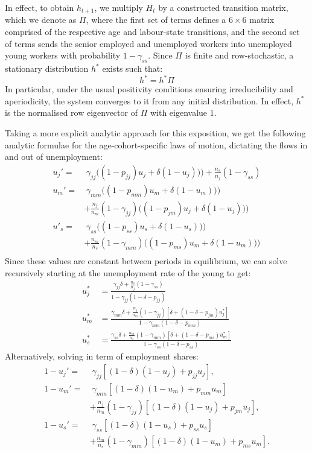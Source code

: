 \documentclass{article}
\begin{document}
In effect, to obtain $h_{t+1}$, we multiply $H_t$ by a constructed transition matrix, which we denote as $\Pi$, where the first set of terms defines a $6\times6$ matrix comprised of the respective age and labour-state transitions, and the second set of terms sends the senior employed and unemployed workers into unemployed young workers with probability $1-\gamma_{ss}$. Since $\Pi$ is finite and row-stochastic, a stationary distribution $h^*$ exists such that:
\[
h^*=h^*\Pi
\]
In particular, under the usual positivity conditions ensuring irreducibility and aperiodicity, the system converges to it from any initial distribution. In effect, $h^*$ is the normalised row eigenvector of $\Pi$ with eigenvalue $1$.

Taking a more explicit analytic approach for this exposition, we get the following analytic formulae for the age-cohort-specific laws of motion, dictating the flows in and out of unemployment:
\begin{align*}
u_j'=&\;\gamma_{jj}\bigl((1-p_{jj})u_j+\delta(1-u_j))\bigr) + \frac{n_s}{n_j}(1-\gamma_{ss})\\
u_m'=&\;\gamma_{mm}\bigl((1-p_{mm})u_m+\delta(1-u_m))\bigr)\\
&+\frac{n_j}{n_m}(1-\gamma_{jj})\bigl((1-p_{jm})u_j+\delta(1-u_j))\bigr)\\
u'_s=&\;\gamma_{ss}\bigl((1-p_{ss})u_s+\delta(1-u_s))\bigr)\\
&+\frac{n_m}{n_s}(1-\gamma_{mm})\bigl((1-p_{ms})u_m+\delta(1-u_m))\bigr)\\
\end{align*}
Since these values are constant between periods in equilibrium, we can solve recursively starting at the unemployment rate of the young to get:
\begin{align*}
u_j^*&=\frac{\gamma_{jj}\delta+\frac{n_s}{n_j}(1-\gamma_{ss})}{1-\gamma_{jj}(1-\delta-p_{jj})}\\
u_m^*&=\frac{\gamma_{mm}\delta+\frac{n_j}{n_m}(1-\gamma_{jj})\left[\delta+(1-\delta-p_{jm})u_j^*\right]}{
1-\gamma_{mm}(1-\delta-p_{mm})}\\
u_s^*&=\frac{\gamma_{ss}\delta+\frac{n_m}{n_s}(1-\gamma_{mm})\left[
\delta+(1-\delta-p_{ms})u_m^*\right]}
{1-\gamma_{ss}(1-\delta-p_{ss})}
\end{align*}
Alternatively, solving in term of employment shares:
\begin{align*}
1-u_j'
=&\;
\gamma_{jj}
\left[
(1-\delta)(1-u_j)+p_{jj}u_j
\right],
\\
1-u_m'
=&\;
\gamma_{mm}
\left[
(1-\delta)(1-u_m)+p_{mm}u_m
\right]\\
&+\frac{n_j}{n_m}(1-\gamma_{jj})
\left[
(1-\delta)(1-u_j)+p_{jm}u_j
\right],
\\
1-u_s'
=&\;
\gamma_{ss}
\left[
(1-\delta)(1-u_s)+p_{ss}u_s
\right]\\
&+\frac{n_m}{n_s}(1-\gamma_{mm})
\left[
(1-\delta)(1-u_m)+p_{ms}u_m
\right].
\end{align*}
\end{document}
